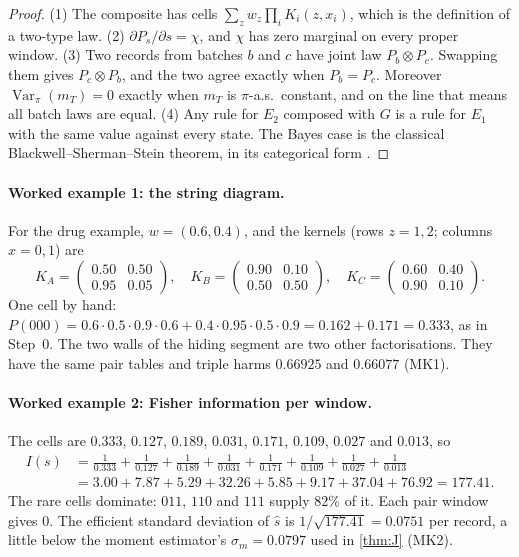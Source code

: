 \documentclass[11pt]{article}
\theoremstyle{definition}\newtheorem{definition}{Definition}\newtheorem{remark}{Remark}
\begin{document}
\begin{proof}
(1) The composite has cells $\sum_zw_z\prod_iK_i(z,x_i)$, which is the definition of a two-type law. (2) $\partial P_s/\partial s=\chi$, and
$\chi$ has zero marginal on every proper window. (3) Two records from batches $b$ and $c$ have joint law $P_b\otimes P_c$. Swapping them
gives $P_c\otimes P_b$, and the two agree exactly when $P_b=P_c$. Moreover $\operatorname{Var}_\pi(m_T)=0$ exactly when $m_T$ is
$\pi$-a.s.\ constant, and on the line that means all batch laws are equal. (4) Any rule for $E_2$ composed with $G$ is a rule for $E_1$
with the same value against every state. The Bayes case is the classical Blackwell--Sherman--Stein theorem, in its categorical form
\cite{FritzGondaPerroneRischel2023}.
\end{proof}

\paragraph{Worked example 1: the string diagram.} For the drug example, $w=(0.6,0.4)$, and the kernels (rows $z=1,2$; columns
$x=0,1$) are
\[
K_A=\begin{pmatrix}0.50&0.50\\0.95&0.05\end{pmatrix},\quad K_B=\begin{pmatrix}0.90&0.10\\0.50&0.50\end{pmatrix},\quad
K_C=\begin{pmatrix}0.60&0.40\\0.90&0.10\end{pmatrix}.
\]
One cell by hand: $P(000)=0.6\cdot0.5\cdot0.9\cdot0.6+0.4\cdot0.95\cdot0.5\cdot0.9=0.162+0.171=0.333$, as in Step~0. The two walls of the
hiding segment are two other factorisations. They have the same pair tables and triple harms $0.66925$ and $0.66077$ (MK1).

\paragraph{Worked example 2: Fisher information per window.} The cells are $0.333$, $0.127$, $0.189$, $0.031$, $0.171$, $0.109$,
$0.027$ and $0.013$, so
\begin{align*}
I(s)&=\tfrac1{0.333}+\tfrac1{0.127}+\tfrac1{0.189}+\tfrac1{0.031}+\tfrac1{0.171}+\tfrac1{0.109}+\tfrac1{0.027}+\tfrac1{0.013}\\
&=3.00+7.87+5.29+32.26+5.85+9.17+37.04+76.92=177.41 .
\end{align*}
The rare cells dominate: $011$, $110$ and $111$ supply $82\%$ of it. Each pair window gives $0$. The efficient standard deviation of $\hat s$
is $1/\sqrt{177.41}=0.0751$ per record, a little below the moment estimator's $\sigma_m=0.0797$ used in \cref{thm:J} (MK2).
\end{document}
